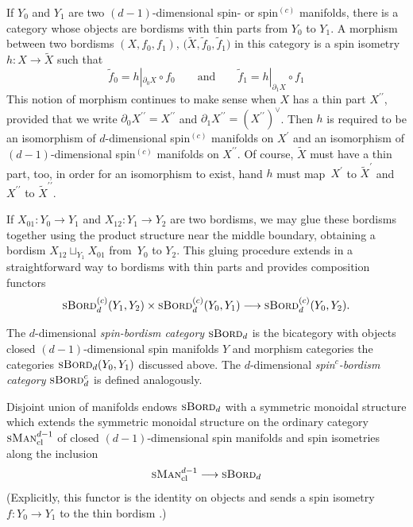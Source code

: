 \documentclass[pdftex]{sigma}
\numberwithin{equation}{section}
\newcommand{\id}{\mathrm{id}}
\newcommand{\sBord}{\textsc{sBord}}
\begin{document}
If $Y_0$ and $Y_1$ are two $(d-1)$-dimensional spin- or spin$^{(c)}$ manifolds, there is a category \smash{$\sBord^{{(c)}}_d(Y_0, Y_1)$} whose objects are bordisms with thin parts from $Y_0$ to $Y_1$.
A morphism between two bordisms $(X, f_0, f_1)$, $\big(\tilde{X}, \tilde{f}_0, \tilde{f}_1\big)$ in this category is a spin isometry $h\colon X \to \tilde{X}$ such that
\begin{equation*}
 \tilde{f}_0 = h|_{\partial_0 X} \circ f_0 \qquad \text{and} \qquad \tilde{f}_1 = h|_{\partial_1 X} \circ f_1
\end{equation*}
This notion of morphism continues to make sense when $X$ has a thin part $X^{\prime\prime}$, provided that we write $\partial_0 X^{\prime\prime} = X^{\prime\prime}$ and $\partial_1 X^{\prime\prime} = (X^{\prime\prime})^\vee$.
Then $h$ is required to be an isomorphism of $d$-dimensional spin$^{(c)}$ manifolds on $X^\prime$ and an isomorphism of $(d-1)$-dimensional spin$^{(c)}$ manifolds on $X^{\prime\prime}$.
Of course, $\tilde{X}$ must have a thin part, too, in order for an isomorphism to exist, hand $h$ must map~$X^\prime$ to $\tilde{X}^\prime$ and $X^{\prime\prime}$ to $\tilde{X}^{\prime\prime}$.

If $X_{01} \colon Y_0 \to Y_1$ and $X_{12} \colon Y_1 \to Y_2$ are two bordisms, we may glue these bordisms together using the product structure near the middle boundary, obtaining a bordism $X_{12} \sqcup_{Y_1} X_{01}$ from~$Y_0$ to $Y_2$.
This gluing procedure extends in a straightforward way to bordisms with thin parts and provides composition functors
\begin{equation*}
\sBord^{{(c)}}_d(Y_1, Y_2) \times \sBord^{{(c)}}_d(Y_0, Y_1) \longrightarrow \sBord^{{(c)}}_d(Y_0, Y_2).
\end{equation*}




\begin{Definition}
The $d$-dimensional \emph{spin-bordism category} $\sBord_d$ is the bicategory with objects closed $(d-1)$-dimensional spin manifolds $Y$ and morphism categories the categories $\sBord_d(Y_0, Y_1)$ discussed above.
The $d$-dimensional \emph{spin$^c$-bordism category} $\sBord^c_d$ is defined analogously.
\end{Definition}

Disjoint union of manifolds endows $\sBord_d$ with a symmetric monoidal structure which extends the symmetric monoidal structure on the ordinary category $\textsc{sMan}^{d-1}_{\mathrm{cl}}$ of closed $(d-1)$-dimensional spin manifolds and spin isometries along the inclusion
\begin{equation}
\label{Spinclusion}
 \textsc{sMan}^{d-1}_{\mathrm{cl}} \longrightarrow \sBord_d
\end{equation}
(Explicitly, this functor is the identity on objects and sends a spin isometry $f\colon Y_0 \to Y_1$ to the thin bordism \smash{$Y_1 \stackrel{\id}{\to} Y_1 \stackrel{f}{\leftarrow} Y_0$}.)
\end{document}
